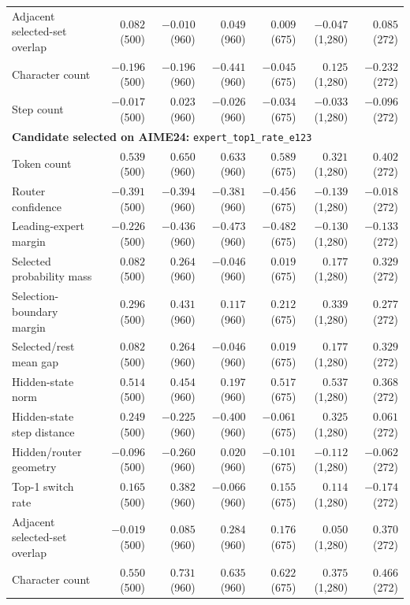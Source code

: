 \begin{longtable}{@{}lrrrrrr@{}}
Adjacent selected-set overlap & $0.082$ (500) & $-0.010$ (960) & $0.049$ (960) & $0.009$ (675) & $-0.047$ (1,280) & $0.085$ (272) \\
Character count & $-0.196$ (500) & $-0.196$ (960) & $-0.441$ (960) & $-0.045$ (675) & $0.125$ (1,280) & $-0.232$ (272) \\
Step count & $-0.017$ (500) & $0.023$ (960) & $-0.026$ (960) & $-0.034$ (675) & $-0.033$ (1,280) & $-0.096$ (272) \\
\midrule
\multicolumn{7}{l}{\textbf{Candidate selected on AIME24:} \texttt{expert\_top1\_rate\_e123}} \\
Token count & $0.539$ (500) & $0.650$ (960) & $0.633$ (960) & $0.589$ (675) & $0.321$ (1,280) & $0.402$ (272) \\
Router confidence & $-0.391$ (500) & $-0.394$ (960) & $-0.381$ (960) & $-0.456$ (675) & $-0.139$ (1,280) & $-0.018$ (272) \\
Leading-expert margin & $-0.226$ (500) & $-0.436$ (960) & $-0.473$ (960) & $-0.482$ (675) & $-0.130$ (1,280) & $-0.133$ (272) \\
Selected probability mass & $0.082$ (500) & $0.264$ (960) & $-0.046$ (960) & $0.019$ (675) & $0.177$ (1,280) & $0.329$ (272) \\
Selection-boundary margin & $0.296$ (500) & $0.431$ (960) & $0.117$ (960) & $0.212$ (675) & $0.339$ (1,280) & $0.277$ (272) \\
Selected/rest mean gap & $0.082$ (500) & $0.264$ (960) & $-0.046$ (960) & $0.019$ (675) & $0.177$ (1,280) & $0.329$ (272) \\
Hidden-state norm & $0.514$ (500) & $0.454$ (960) & $0.197$ (960) & $0.517$ (675) & $0.537$ (1,280) & $0.368$ (272) \\
Hidden-state step distance & $0.249$ (500) & $-0.225$ (960) & $-0.400$ (960) & $-0.061$ (675) & $0.325$ (1,280) & $0.061$ (272) \\
Hidden/router geometry & $-0.096$ (500) & $-0.260$ (960) & $0.020$ (960) & $-0.101$ (675) & $-0.112$ (1,280) & $-0.062$ (272) \\
Top-1 switch rate & $0.165$ (500) & $0.382$ (960) & $-0.066$ (960) & $0.155$ (675) & $0.114$ (1,280) & $-0.174$ (272) \\
Adjacent selected-set overlap & $-0.019$ (500) & $0.085$ (960) & $0.284$ (960) & $0.176$ (675) & $0.050$ (1,280) & $0.370$ (272) \\
Character count & $0.550$ (500) & $0.731$ (960) & $0.635$ (960) & $0.622$ (675) & $0.375$ (1,280) & $0.466$ (272) \\

\end{longtable}
